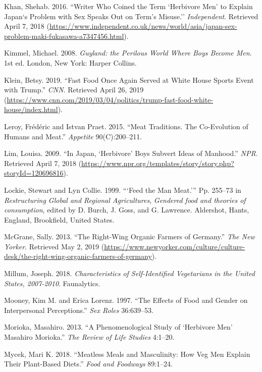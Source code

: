 \documentclass[twoside]{report}
\begin{document}
\begin{multicols*}{2}
\hypertarget{khan}{Khan, Shehab. 2016. ``Writer Who Coined the Term `Herbivore Men' to
Explain Japan`s Problem with Sex Speaks Out on Term's Misuse.''
\emph{Independent}. Retrieved April 7, 2018
(\url{https://www.independent.co.uk/news/world/asia/japan-sex-problem-maki-fukasawa-a7347456.html}).}

\hypertarget{kimmel}{Kimmel, Michael. 2008. \emph{Guyland: the Perilous World Where Boys
Become Men}. 1st ed. London, New York: Harper Collins.}

\hypertarget{klein}{Klein, Betsy. 2019. ``Fast Food Once Again Served at White House Sports
Event with Trump.'' \emph{CNN}. Retrieved April 26, 2019
(\url{https://www.cnn.com/2019/03/04/politics/trump-fast-food-white-house/index.html}).}

\hypertarget{leroy}{Leroy, Frédéric and Istvan Praet. 2015. ``Meat Traditions. The Co-Evolution of Humans and Meat.'' \emph{Appetite} 90(C):200--211.}

\hypertarget{lim}{Lim, Louisa. 2009. ``In Japan, `Herbivore' Boys Subvert Ideas of
Manhood.'' \emph{NPR}. Retrieved April 7, 2018
(\url{https://www.npr.org/templates/story/story.php?storyId=120696816}).}

\hypertarget{lockie}{Lockie, Stewart and Lyn Collie. 1999. ```Feed the Man Meat.''' Pp.
255--73 in \emph{Restructuring Global and Regional Agricultures},
\emph{Gendered food and theories of consumption}, edited by D. Burch, J.
Goss, and G. Lawrence. Aldershot, Hants, England, Brookfield, United
States.}

\hypertarget{mcgrane}{McGrane, Sally. 2013. ``The Right-Wing Organic Farmers of Germany.''
\emph{The New Yorker}. Retrieved May 2, 2019
(\url{https://www.newyorker.com/culture/culture-desk/the-right-wing-organic-farmers-of-germany}).}

\hypertarget{millum}{Millum, Joseph. 2018. \emph{Characteristics of Self-Identified
Vegetarians in the United States, 2007-2010}. Faunalytics.}
\pagebreak

\hypertarget{mooney}{Mooney, Kim M. and Erica Lorenz. 1997. ``The Effects of Food and Gender on Interpersonal Perceptions.'' \emph{Sex Roles} 36:639--53.}

\hypertarget{morioka}{Morioka, Masahiro. 2013. ``A Phenomenological Study of `Herbivore Men'
Masahiro Morioka.'' \emph{The Review of Life Studies} 4:1--20.}

\hypertarget{mycek}{Mycek, Mari K. 2018. ``Meatless Meals and Masculinity: How Veg Men
Explain Their Plant-Based Diets.'' \emph{Food and Foodways} 89:1--24.}


\end{multicols*}
\end{document}
